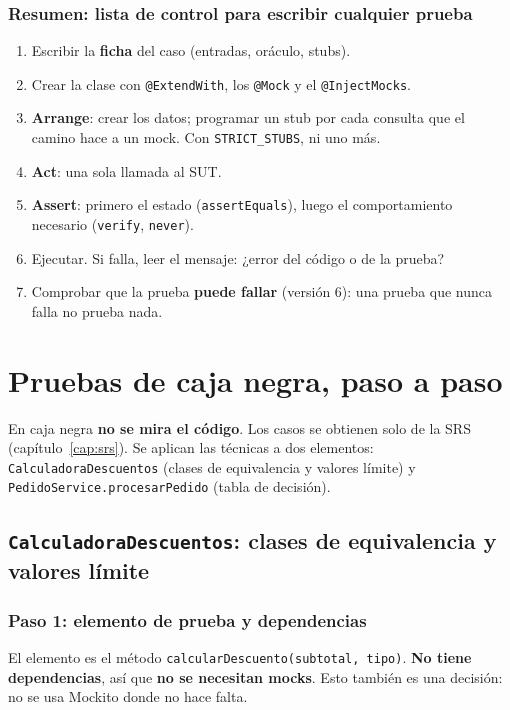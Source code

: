\documentclass[11pt,a4paper,oneside]{report}
\newcommand{\code}[1]{\texttt{#1}}
\begin{document}
\subsection{Resumen: lista de control para escribir cualquier prueba}
\begin{enumerate}
  \item Escribir la \textbf{ficha} del caso (entradas, oráculo, stubs).
  \item Crear la clase con \code{@ExtendWith}, los \code{@Mock} y el \code{@InjectMocks}.
  \item \textbf{Arrange}: crear los datos; programar un stub por cada consulta que el camino hace a un mock. Con \code{STRICT\_STUBS}, ni uno más.
  \item \textbf{Act}: una sola llamada al SUT.
  \item \textbf{Assert}: primero el estado (\code{assertEquals}), luego el comportamiento necesario (\code{verify}, \code{never}).
  \item Ejecutar. Si falla, leer el mensaje: ¿error del código o de la prueba?
  \item Comprobar que la prueba \textbf{puede fallar} (versión 6): una prueba que nunca falla no prueba nada.
\end{enumerate}

\chapter{Pruebas de caja negra, paso a paso}
\label{cap:cajanegra}

En caja negra \textbf{no se mira el código}. Los casos se obtienen solo de la SRS (capítulo~\ref{cap:srs}). Se aplican las técnicas a dos elementos: \code{CalculadoraDescuentos} (clases de equivalencia y valores límite) y \code{PedidoService.procesarPedido} (tabla de decisión).

\section{\code{CalculadoraDescuentos}: clases de equivalencia y valores límite}

\subsection{Paso 1: elemento de prueba y dependencias}
El elemento es el método \code{calcularDescuento(subtotal, tipo)}. \textbf{No tiene dependencias}, así que \textbf{no se necesitan mocks}. Esto también es una decisión: no se usa Mockito donde no hace falta.
\end{document}
